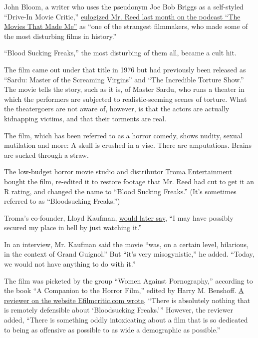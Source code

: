 John Bloom, a writer who uses the pseudonym Joe Bob Briggs as a
self-styled ``Drive-In Movie Critic,''
\href{https://trailersfromhell.com/podcast/joe-bob-briggs-rides-again/}{eulogized
Mr. Reed last month on the podcast ``The Movies That Made Me''} as ``one
of the strangest filmmakers, who made some of the most disturbing films
in history.''

``Blood Sucking Freaks,'' the most disturbing of them all, became a cult
hit.

The film came out under that title in 1976 but had previously been
released as ``Sardu: Master of the Screaming Virgins'' and ``The
Incredible Torture Show.'' The movie tells the story, such as it is, of
Master Sardu, who runs a theater in which the performers are subjected
to realistic-seeming scenes of torture. What the theatergoers are not
aware of, however, is that the actors are actually kidnapping victims,
and that their torments are real.

The film, which has been referred to as a horror comedy, shows nudity,
sexual mutilation and more: A skull is crushed in a vise. There are
amputations. Brains are sucked through a straw.

The low-budget horror movie studio and distributor
\href{https://www.nytimes.com/1992/07/20/movies/troma-the-film-studio-that-says-low-is-good-and-bad-may-be-better.html}{Troma
Entertainment} bought the film, re-edited it to restore footage that Mr.
Reed had cut to get it an R rating, and changed the name to ``Blood
Sucking Freaks.'' (It's sometimes referred to as ``Bloodsucking
Freaks.'')

Troma's co-founder, Lloyd Kaufman,
\href{https://www.dvdtalk.com/horror/blog/bloodsucking_freaks_not_about.html}{would
later say}, ``I may have possibly secured my place in hell by just
watching it.''

In an interview, Mr. Kaufman said the movie ``was, on a certain level,
hilarious, in the context of Grand Guignol.'' But ``it's very
misogynistic,'' he added. ``Today, we would not have anything to do with
it.''

The film was picketed by the group ``Women Against Pornography,''
according to the book ``A Companion to the Horror Film,'' edited by
Harry M. Benshoff.
\href{https://www.efilmcritic.com/review.php?movie=2540\&reviewer=248}{A
reviewer on the website Efilmcritic.com wrote}, ``There is absolutely
nothing that is remotely defensible about `Bloodsucking Freaks.'''
However, the reviewer added, ``There is something oddly intoxicating
about a film that is so dedicated to being as offensive as possible to
as wide a demographic as possible.''

